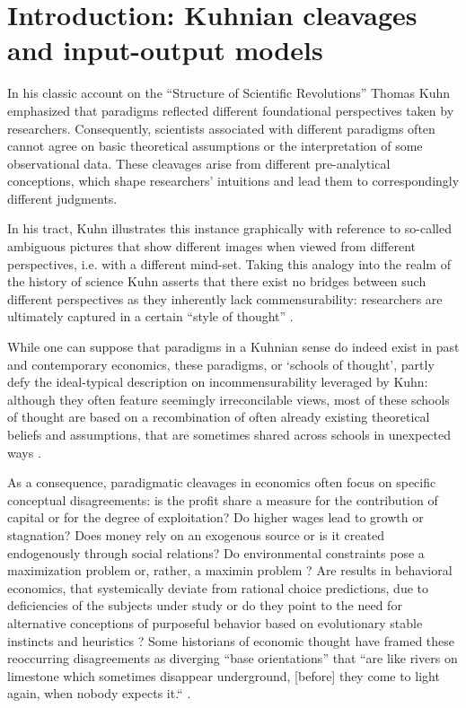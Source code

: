 
\section{Introduction: Kuhnian cleavages and input-output models}

In his classic account on the “Structure of Scientific Revolutions” Thomas Kuhn \citetext{\citealp{Kuhn1962}, see also \citealt{Fleck1935}} emphasized that paradigms reflected different foundational perspectives taken by researchers. Consequently, scientists associated with different paradigms often cannot agree on basic theoretical assumptions or the interpretation of some observational data. These cleavages arise from different pre-analytical conceptions, which shape researchers’ intuitions and lead them to correspondingly different judgments.

In his tract, Kuhn illustrates this instance graphically with reference to so-called ambiguous pictures that show different images when viewed from different perspectives, i.e. with a different mind-set. Taking this analogy into the realm of the history of science Kuhn asserts that there exist no bridges between such different perspectives as they inherently lack commensurability: researchers are ultimately captured in a certain “style of thought” \citep{Fleck1935}.

While one can suppose that paradigms in a Kuhnian sense do indeed exist in past and contemporary economics, these paradigms, or ‘schools of thought’, partly defy the ideal-typical description on incommensurability leveraged by Kuhn: although they often feature seemingly irreconcilable views, most of these schools of thought are based on a recombination of often already existing theoretical beliefs and assumptions, that are sometimes shared across schools in unexpected ways \citep[e.g.][]{Kaldor1961,Lawson1985}.

As a consequence, paradigmatic cleavages in economics often focus on specific conceptual disagreements: is the profit share a measure for the contribution of capital or for the degree of exploitation? Do higher wages lead to growth or stagnation? Does money rely on an exogenous source or is it created endogenously through social relations? Do environmental constraints pose a maximization problem or, rather, a maximin problem \citep{Costanza.1989}? Are results in behavioral economics, that systemically deviate from rational choice predictions, due to deficiencies of the subjects under study \citep{Gintis.2010} or do they point to the need for alternative conceptions of purposeful behavior based on evolutionary stable instincts and heuristics \citep{gigerenzer1999simple}? Some historians of economic thought have framed these reoccurring disagreements as diverging “base orientations” that “are like rivers on limestone which sometimes disappear underground, [before] they come to light again, when nobody expects it.“ \citep[][p. 9]{Screpanti2005}.

